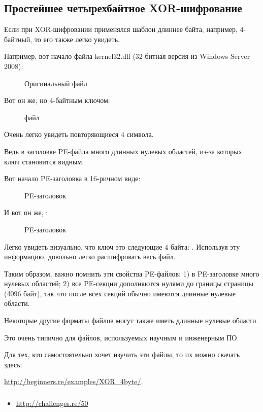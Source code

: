 \clearpage
\subsection{Простейшее четырехбайтное XOR-шифрование}

Если при XOR-шифровании применялся шаблон длиннее байта, например, 4-байтный, то его также легко увидеть.

Например, вот начало файла kernel32.dll (32-битная версия из Windows Server 2008):

\begin{figure}[H]
\centering
{}
\caption{Оригинальный файл}
\end{figure}

\clearpage
Вот он же, но  4-байтным ключом:

\begin{figure}[H]
\centering
{}
\caption{ файл}
\end{figure}

Очень легко увидеть повторяющиеся 4 символа.

Ведь в заголовке PE-файла много длинных нулевых областей, из-за которых ключ становится видным.

\clearpage
Вот начало PE-заголовка в 16-ричном виде:

\begin{figure}[H]
\centering
{}
\caption{PE-заголовок}
\end{figure}

\clearpage
И вот он же, :

\begin{figure}[H]
\centering
{}
\caption{ PE-заголовок}
\end{figure}

Легко увидеть визуально, что ключ это следующие 4 байта: .
Используя эту информацию, довольно легко расшифровать весь файл.

Таким образом, важно помнить эти свойства PE-файлов:
1) в PE-заголовке много нулевых областей;
2) все PE-секции дополняются нулями до границы страницы (4096 байт), 
так что после всех секций обычно имеются длинные нулевые области.

Некоторые другие форматы файлов могут также иметь длинные нулевые области.

Это очень типично для файлов, используемых научным и инженерным ПО.

Для тех, кто самостоятельно хочет изучить эти файлы, то их можно скачать здесь:

\url{http://beginners.re/examples/XOR_4byte/}.

\subsubsection{\Exercise}

\begin{itemize}
	\item \url{http://challenges.re/50}
\end{itemize}

